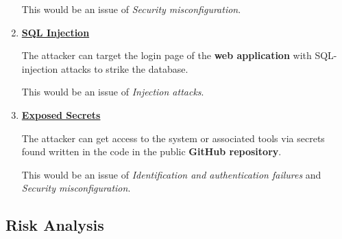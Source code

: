 \begin{enumerate}
    This would be an issue of \textit{Security misconfiguration}.
    \item \textbf{\underline{SQL Injection}}

    The attacker can target the login page of the \textbf{web application} with SQL-injection attacks to strike the database.

    This would be an issue of \textit{Injection attacks}.
    \item \textbf{\underline{Exposed Secrets}}

    The attacker can get access to the system or associated tools via secrets found written in the code in the public \textbf{GitHub repository}.

    This would be an issue of \textit{Identification and authentication failures} and \textit{Security misconfiguration}.
\end{enumerate}
\subsection{Risk Analysis}
